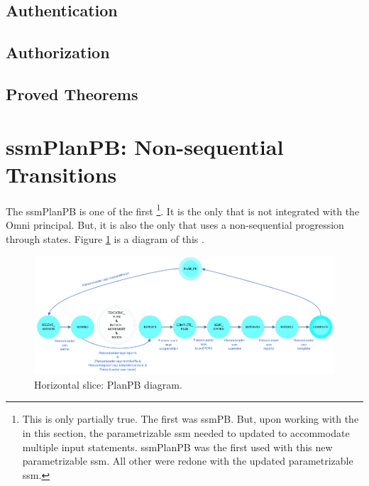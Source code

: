 \documentclass[../../main/main.tex]{subfiles}
\begin{document}
\subsection{Authentication}
\HOLssmPlanPBTheoremsinputOKXXdef


\HOLPBIntegratedDefTheoremsgetOmniCommandXXdef


\subsection{Authorization}
\subsection{Proved Theorems}



\section{ssmPlanPB: Non-sequential Transitions}
The ssmPlanPB  is one of the first \footnote{This is only partially true.  The first  was ssmPB.  But, upon working with the  in this section, the parametrizable ssm needed to updated to accommodate multiple input statements.  ssmPlanPB was the first  used with this new parametrizable ssm.  All other  were redone with the updated parametrizable ssm.}. It is the only  that is not integrated with the Omni principal.  But, it is also the only  that uses a non-sequential progression through states.  Figure \ref{ssmPlanPBDiagram2} is a diagram of this .

\begin{figure}[h!]
\centering
\includegraphics[width=\textwidth]{../figures/ssmPlanPBDiagram}
\caption{\label{ssmPlanPBDiagram2} Horizontal slice: PlanPB diagram.}
\end{figure}
\end{document}

